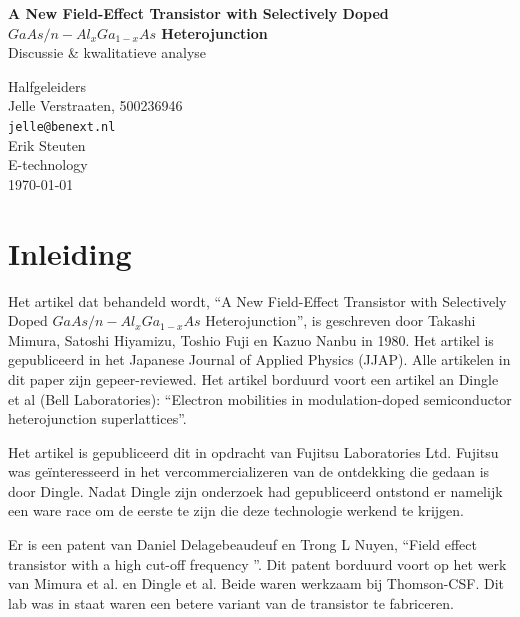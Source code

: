 \documentclass[11pt]{report}
\newlength{\leftbarwidth}
\newlength{\leftbarsep}
\newcommand*{\leftbarcolorcmd}{\color{leftbarcolor}}%
\renewenvironment{leftbar}{%
    \def\FrameCommand{{\leftbarcolorcmd{\vrule width \leftbarwidth\relax\hspace {\leftbarsep}}}}%
    \MakeFramed {\advance \hsize -\width \FrameRestore }}{\endMakeFramed}
\begin{document}
\begin{titlepage}
\begin{center}
{\huge\bfseries A New Field-Effect Transistor with Selectively Doped $GaAs/n-Al_{x}Ga_{1-x}As$ Heterojunction}
\\ \bigskip
{\Large Discussie \& kwalitatieve analyse}
\end{center}
\vfill
\begin{flushleft}
\setlength{\leftbarwidth}{1pt}
\begin{leftbar}
Halfgeleiders \\
Jelle Verstraaten, 500236946 \\
\texttt{jelle@benext.nl} \\
Erik Steuten\\
E-technology \\
{\small \today} \\
\end{leftbar}
\end{flushleft}
\end{titlepage}

\tableofcontents

\chapter{Inleiding}

Het artikel dat behandeld wordt, ``A New Field-Effect Transistor with Selectively Doped $GaAs/n-Al_{x}Ga_{1-x}As$ Heterojunction'', is geschreven door Takashi Mimura, Satoshi Hiyamizu, Toshio Fuji en Kazuo Nanbu in 1980. Het artikel is gepubliceerd in het Japanese Journal of Applied Physics (JJAP). Alle artikelen in dit paper zijn gepeer-reviewed. Het artikel borduurd voort een artikel an Dingle et al (Bell Laboratories): ``Electron mobilities in modulation-doped semiconductor heterojunction superlattices''.

Het artikel is gepubliceerd dit in opdracht van Fujitsu Laboratories Ltd. Fujitsu was ge\"interesseerd in het vercommercializeren van de ontdekking die gedaan is door Dingle. Nadat Dingle zijn onderzoek had gepubliceerd ontstond er namelijk een ware race om de eerste te zijn die deze technologie werkend te krijgen.

Er is een patent van Daniel Delagebeaudeuf en Trong L Nuyen, ``Field effect transistor with a high cut-off frequency ''. Dit patent borduurd voort op het werk van Mimura et al. en Dingle et al. Beide waren werkzaam bij Thomson-CSF. Dit lab was in staat waren een betere variant van de transistor te fabriceren. 
\end{document}
